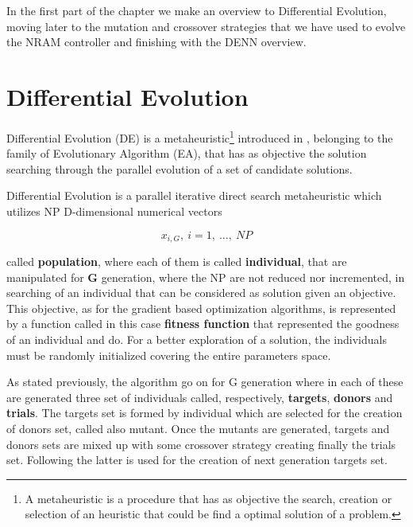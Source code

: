 \label{chap:differential-evolution}
In the first part of the chapter we make an overview to Differential Evolution, moving later to the mutation and crossover strategies that we have used to evolve the NRAM controller and finishing with the DENN overview.

\section{Differential Evolution}
Differential Evolution (DE) is a metaheuristic\footnote{A metaheuristic is a procedure that has as objective the search, creation or selection of an heuristic that could be find a optimal solution of a problem.} introduced in \cite{DESEHGOCS:1997}, belonging to the family of Evolutionary Algorithm (EA), that has as objective the solution searching through the parallel evolution of a set of candidate solutions. 

Differential Evolution is a parallel iterative direct search metaheuristic which utilizes NP D-dimensional numerical vectors 
\begin{center}
	\begin{equation}
		x_{i, G},\ i=1,\ \dots,\ NP 
	\end{equation}
\end{center}
called \textbf{population}, where each of them is called \textbf{individual}, that are manipulated for \textbf{G} generation, where the NP are not reduced nor incremented, in searching of an individual that can be considered as solution given an objective. This objective, as for the gradient based optimization algorithms, is represented by a function called in this case \textbf{fitness function} that represented the goodness of an individual and do. For a better exploration of a solution, the individuals must be randomly initialized covering the entire parameters space. 

As stated previously, the algorithm go on for G generation where in each of these are generated three set of individuals called, respectively, \textbf{targets}, \textbf{donors} and \textbf{trials}. The targets set is formed by individual which are selected for the creation of donors set, called also mutant. Once the mutants are generated, targets and donors sets are mixed up with some crossover strategy creating finally the trials set. Following the latter is used for the creation of next generation targets set. \\

